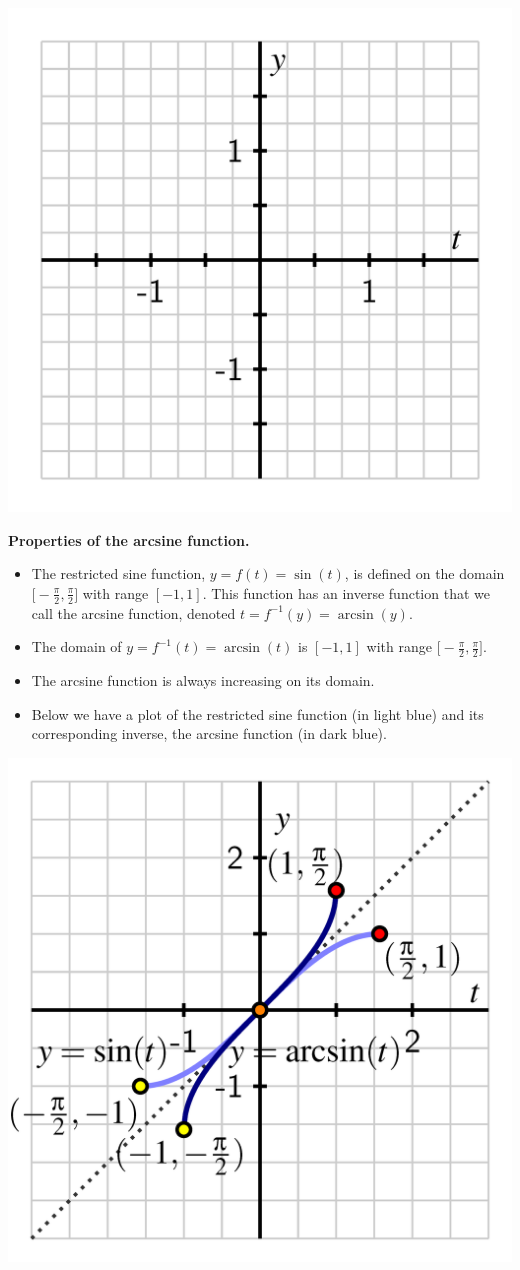 \documentclass{ximera}
\begin{document}
\begin{problem}
\includegraphics[width=.8\linewidth]{inverse-trig-blank-axes-arcsin.png}
\end{problem}

\begin{callout}{\bf Properties of the arcsine function.}%
\begin{itemize}
\item
The restricted sine function, $y = f(t) = \sin(t)$, is defined on the domain $\Big[\!\!-\!\frac{\pi}{2},\frac{\pi}{2}\Big]$ with range $[-1,1]$.  This function has an inverse function that we call the arcsine function, denoted $t = f^{-1}(y) = \arcsin(y)$.%
\item
The domain of $y = f^{-1}(t) = \arcsin(t)$ is $[-1,1]$ with range $\Big[\!-\!\frac{\pi}{2},\frac{\pi}{2}\Big]$.%
\item
The arcsine function is always increasing on its domain.%
\item
Below we have a plot of the restricted sine function (in light blue) and its corresponding inverse, the arcsine function (in dark blue).%
\end{itemize}
\includegraphics[width=.8\linewidth]{inverse-trig-arcsin-graph.png}
\end{callout}
\end{document}

